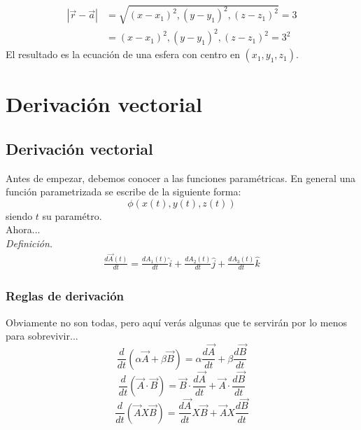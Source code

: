 \documentclass[12pt,openany]{book}
\begin{document}
				\begin{equation*}
				 	\begin{split}
				 		|\vec{r}-\vec{a}|&=\sqrt{(x-x_{1})^{2},(y-y_{1})^{2},(z-z_{1})^{2}}=3  	\\
				 						 &=(x-x_{1})^{2},(y-y_{1})^{2},(z-z_{1})^{2}=3^{2}
				 	\end{split}
				\end{equation*}
				El resultado es la ecuaci\'on de una esfera con centro en $(x_{1},y_{1},z_{1})$.

\chapter{Derivaci\'on vectorial}
		
	\section{Derivaci\'on vectorial}
		Antes de empezar, debemos conocer a las funciones param\'etricas. En general una funci\'on parametrizada 
		se escribe de la siguiente forma:\\
		$$
			\phi(x(t),y(t),z(t))
		$$
		siendo $t$ su param\'etro.\\
		Ahora...\\
		\noindent\textsl{Definici\'on.}\\
		\begin{equation*}
			\begin{split}
				\frac{d\vec{A}(t)}{dt}=\frac{dA_{1}(t)}{dt}\hat{i}+\frac{dA_{2}(t)}{dt}\hat{j}
									   +\frac{dA_{3}(t)}{dt}\hat{k}
			\end{split}
		\end{equation*}

		\subsection{Reglas de derivaci\'on}
			Obviamente no son todas, pero aqu\'i ver\'as algunas que te servir\'an por lo
		   	menos para sobrevivir...\\
				$$\frac{d}{dt}(\alpha\vec{A}+\beta\vec{B})=\alpha\frac{d\vec{A}}{dt}
																		 +\beta\frac{d\vec{B}}{dt}$$
				$$\frac{d}{dt}(\vec{A}\cdot\vec{B})=\vec{B}\cdot\frac{d\vec{A}}{dt}
																  +\vec{A}\cdot\frac{d\vec{B}}{dt}$$
				$$\frac{d}{dt}(\vec{A}X\vec{B})=\frac{d\vec{A}}{dt}X\vec{B}
										 						  +\vec{A}X\frac{d\vec{B}}{dt}$$	
\end{document}
